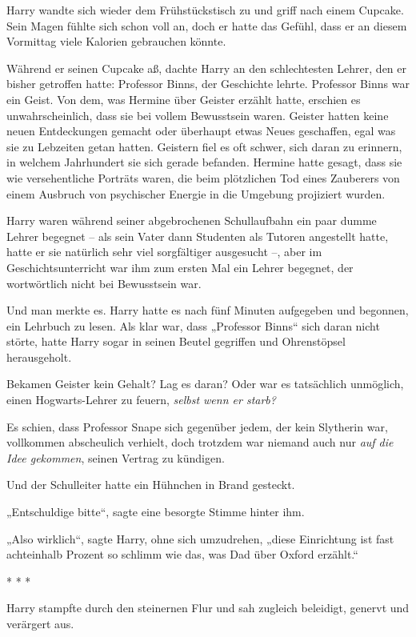 {Harry wandte sich wieder dem Frühstückstisch zu und griff nach einem Cupcake. Sein Magen fühlte sich schon voll an, doch er hatte das Gefühl, dass er an diesem Vormittag viele Kalorien gebrauchen könnte.

Während er seinen Cupcake aß, dachte Harry an den schlechtesten Lehrer, den er bisher getroffen hatte: Professor Binns, der Geschichte lehrte. Professor Binns war ein Geist. Von dem, was Hermine über Geister erzählt hatte, erschien es unwahrscheinlich, dass sie bei vollem Bewusstsein waren. Geister hatten keine neuen Entdeckungen gemacht oder überhaupt etwas Neues geschaffen, egal was sie zu Lebzeiten getan hatten. Geistern fiel es oft schwer, sich daran zu erinnern, in welchem Jahrhundert sie sich gerade befanden. Hermine hatte gesagt, dass sie wie versehentliche Porträts waren, die beim plötzlichen Tod eines Zauberers von einem Ausbruch von psychischer Energie in die Umgebung projiziert wurden.

Harry waren während seiner abgebrochenen Schullaufbahn ein paar dumme Lehrer begegnet -- als sein Vater dann Studenten als Tutoren angestellt hatte, hatte er sie natürlich sehr viel sorgfältiger ausgesucht --, aber im Geschichtsunterricht war ihm zum ersten Mal ein Lehrer begegnet, der wortwörtlich nicht bei Bewusstsein war.

Und man merkte es. Harry hatte es nach fünf Minuten aufgegeben und begonnen, ein Lehrbuch zu lesen. Als klar war, dass „Professor Binns“ sich daran nicht störte, hatte Harry sogar in seinen Beutel gegriffen und Ohrenstöpsel herausgeholt.

Bekamen Geister kein Gehalt? Lag es daran? Oder war es tatsächlich unmöglich, einen Hogwarts-Lehrer zu feuern, \emph{selbst wenn er starb?}

Es schien, dass Professor Snape sich gegenüber jedem, der kein Slytherin war, vollkommen abscheulich verhielt, doch trotzdem war niemand auch nur \emph{auf die Idee gekommen}, seinen Vertrag zu kündigen.

Und der Schulleiter hatte ein Hühnchen in Brand gesteckt.

„Entschuldige bitte“, sagte eine besorgte Stimme hinter ihm.

„Also wirklich“, sagte Harry, ohne sich umzudrehen, „diese Einrichtung ist fast achteinhalb Prozent so schlimm wie das, was Dad über Oxford erzählt.“

* * *

Harry stampfte durch den steinernen Flur und sah zugleich beleidigt, genervt und verärgert aus.

}
